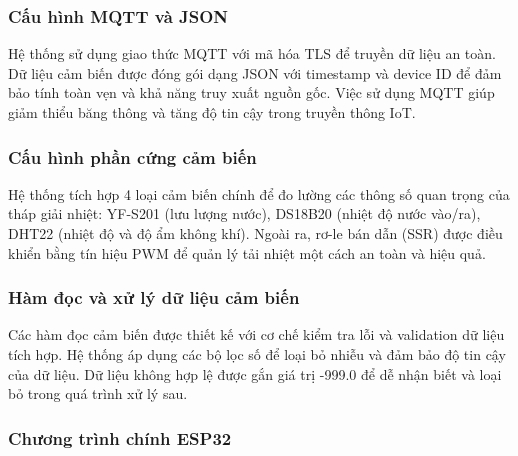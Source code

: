 \documentclass[../main.tex]{subfiles}
\begin{document}
\subsubsection{Cấu hình MQTT và JSON}
\label{sec:mqtt_json_config}

Hệ thống sử dụng giao thức MQTT với mã hóa TLS để truyền dữ liệu an toàn. Dữ liệu cảm biến được đóng gói dạng JSON với timestamp và device ID để đảm bảo tính toàn vẹn và khả năng truy xuất nguồn gốc. Việc sử dụng MQTT giúp giảm thiểu băng thông và tăng độ tin cậy trong truyền thông IoT.



\subsubsection{Cấu hình phần cứng cảm biến}
\label{sec:sensor_hardware_config}

Hệ thống tích hợp 4 loại cảm biến chính để đo lường các thông số quan trọng của tháp giải nhiệt: YF-S201 (lưu lượng nước), DS18B20 (nhiệt độ nước vào/ra), DHT22 (nhiệt độ và độ ẩm không khí). Ngoài ra, rơ-le bán dẫn (SSR) được điều khiển bằng tín hiệu PWM để quản lý tải nhiệt một cách an toàn và hiệu quả.



\subsubsection{Hàm đọc và xử lý dữ liệu cảm biến}
\label{sec:sensor_data_processing}

Các hàm đọc cảm biến được thiết kế với cơ chế kiểm tra lỗi và validation dữ liệu tích hợp. Hệ thống áp dụng các bộ lọc số để loại bỏ nhiễu và đảm bảo độ tin cậy của dữ liệu. Dữ liệu không hợp lệ được gắn giá trị -999.0 để dễ nhận biết và loại bỏ trong quá trình xử lý sau.



\subsubsection{Chương trình chính ESP32}
\label{sec:esp32_main_program}
\end{document}
